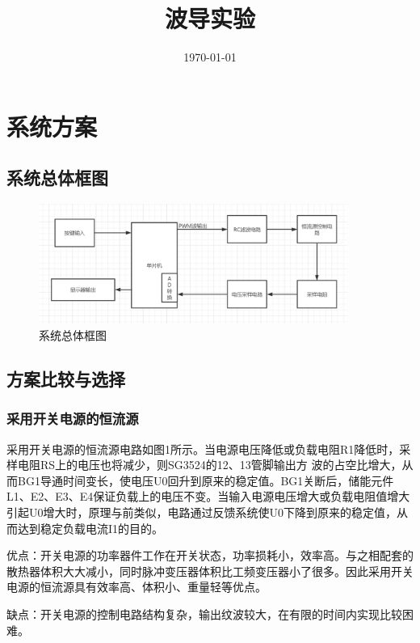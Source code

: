 \documentclass{zjureport}
\title{波导实验}
\date{\today}
\begin{document}
    \makecover
    \makeheader

    \section{系统方案}
        \subsection{系统总体框图}

        \begin{figure}[thp]
            \centering
            \includegraphics[width = 0.9\textwidth]{figure/系统框图.png}
            \caption{系统总体框图}
        \end{figure}

        \subsection{方案比较与选择}
            \subsubsection{采用开关电源的恒流源}

            采用开关电源的恒流源电路如图1所示。当电源电压降低或负载电阻R1降低时，采样电阻RS上的电压也将减少，则SG3524的12、13管脚输出方 波的占空比增大，从而BG1导通时间变长，使电压U0回升到原来的稳定值。BG1关断后，储能元件L1、E2、E3、E4保证负载上的电压不变。当输入电源电压增大或负载电阻值增大引起U0增大时，原理与前类似，电路通过反馈系统使U0下降到原来的稳定值，从而达到稳定负载电流I1的目的。

            优点：开关电源的功率器件工作在开关状态，功率损耗小，效率高。与之相配套的散热器体积大大减小，同时脉冲变压器体积比工频变压器小了很多。因此采用开关电源的恒流源具有效率高、体积小、重量轻等优点。

            缺点：开关电源的控制电路结构复杂，输出纹波较大，在有限的时间内实现比较困难。
            \newpage
\end{document}

